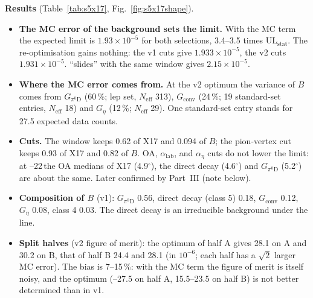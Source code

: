 \textbf{Results} (Table~\ref{tab:s5x17}, Fig.~\ref{fig:s5x17shape}).
\begin{itemize}
\item \textbf{The MC error of the background sets the limit.} With the MC term the expected limit is
      $1.93\times10^{-5}$ for both selections, 3.4--3.5 times $\mathrm{UL}_{\mathrm{stat}}$. The
      re-optimisation gains nothing: the v1 cuts give $1.933\times10^{-5}$, the v2 cuts
      $1.931\times10^{-5}$. ``slides'' with the same \Mee window gives $2.15\times10^{-5}$.
\item \textbf{Where the MC error comes from.} At the v2 optimum the variance of $B$ comes from
      $G_{\pi^0\mathrm{D}}$ (60\,\%; lep set, $N_{\mathrm{eff}}$ 313), $G_{\mathrm{conv}}$ (24\,\%; 19 standard-set
      entries, $N_{\mathrm{eff}}$ 18) and $G_\eta$ (12\,\%; $N_{\mathrm{eff}}$ 29). One standard-set entry stands for 27.5
      expected data counts.
\item \textbf{Cuts.} The \Mee window keeps 0.62 of X17 and 0.094 of $B$; the pion-vertex cut keeps
      0.93 of X17 and 0.82 of $B$. OA, $\alpha_{\mathrm{lab}}$, \Mpipi and $\alpha_\eta$ cuts do not
      lower the limit: at --22\,\MeVcc the OA medians of X17 (4.9$^\circ$), the direct decay
      (4.6$^\circ$) and $G_{\pi^0\mathrm{D}}$ (5.2$^\circ$) are about the same. Later confirmed by Part~III (note below).
\item \textbf{Composition of $B$} (v1): $G_{\pi^0\mathrm{D}}$ 0.56, direct decay (class 5) 0.18,
      $G_{\mathrm{conv}}$ 0.12, $G_\eta$ 0.08, class 4 0.03. The direct decay is an irreducible
      background under the line.
\item \textbf{Split halves} (v2 figure of merit): the optimum of half A gives 28.1 on A and 30.2 on
      B, that of half B 24.4 and 28.1 (in $10^{-6}$; each half has a $\sqrt2$ larger MC error). The
      bias is 7--15\,\%: with the MC term the figure of merit is itself noisy, and the optimum
      (--27.5 on half A, 15.5--23.5 on half B) is not better determined than in v1.
\end{itemize}

